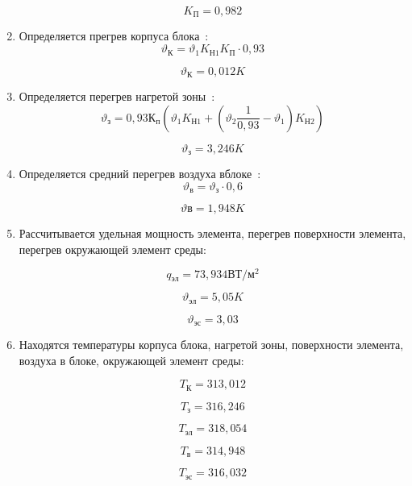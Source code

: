 \begin{enumerate}[label={\arabic*.}]
  $$K\mathrm{_П} = 0,982$$

\item Определяется прегрев корпуса блока~\cite{Rotkop1976}:
  \begin{equation}
    \vartheta\mathrm{_К} = \vartheta_1K\mathrm{_{Н1}}K\mathrm{_П} \cdot 0,93
  \end{equation}

  $$\vartheta\mathrm{_К} =0,012K$$

\item Определяется перегрев нагретой зоны~\cite{Rotkop1976}:
  \begin{equation}
\vartheta\mathrm{_з} = 0,93К\mathrm{_п}(\vartheta_1K\mathrm{_{Н1}} + (\vartheta_2\frac{1}{0,93} - \vartheta_1)K\mathrm{_{Н2}})
\end{equation}

$$\vartheta\mathrm{_з} = 3,246 K$$

\item Определяется средний перегрев воздуха вблоке~\cite{Rotkop1976}:
\begin{equation}
\vartheta\mathrm{_в} = \vartheta\mathrm{_з} \cdot 0,6
\end{equation}

$$\vartheta\mathrm{в} = 1,948 K$$


\item Рассчитывается удельная мощность элемента,
  перегрев поверхности элемента,
  перегрев окружающей элемент среды:

$$q\mathrm{_{эл}}= 73,934\mathrm{ВТ/м^2}$$

$$\vartheta\mathrm{_{эл}} = 5,05K$$

$$\vartheta\mathrm{_{эс}} = 3,03$$

\item Находятся температуры
  корпуса блока,
  нагретой зоны,
  поверхности элемента,
  воздуха в блоке,
  окружающей элемент среды:

  
$$T\mathrm{_К} = 313,012$$

$$T\mathrm{_з} = 316,246$$

$$T\mathrm{_{эл}} = 318,054$$

$$T\mathrm{_{в}} = 314,948$$

$$T\mathrm{_{эс}} = 316,032$$


\end{enumerate}